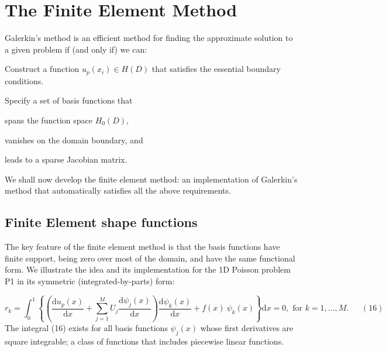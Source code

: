 \hypertarget{index_fe}{}\section{The Finite Element Method}\label{index_fe}
Galerkin's method is an efficient method for finding the approximate solution to a given problem if (and only if) we can\-:
\begin{DoxyEnumerate}
\item Construct a function $ u_p(x_i) \in H(D)$ that satisfies the essential boundary conditions.
\item Specify a set of basis functions that
\begin{DoxyEnumerate}
\item spans the function space $ H_0(D)$,
\item vanishes on the domain boundary, and
\item leads to a sparse Jacobian matrix.
\end{DoxyEnumerate}
\end{DoxyEnumerate}We shall now develop the finite element method\-: an implementation of Galerkin's method that automatically satisfies all the above requirements.



\hypertarget{index_fe_basis_fct}{}\subsection{Finite Element shape functions}\label{index_fe_basis_fct}
The key feature of the finite element method is that the basis functions have finite support, being zero over most of the domain, and have the same functional form. We illustrate the idea and its implementation for the 1\-D Poisson problem P1 in its symmetric (integrated-\/by-\/parts) form\-:

\[ r_k = \int_0^1 \left\{ \left( \frac{\mbox{d} u_p(x)}{\mbox{d} x} +\sum_{j=1}^{M} U_{j} \frac{\mbox{d} \psi_j(x)}{\mbox{d} x} \right) \frac{\mbox{d} \psi_k(x)}{\mbox{d} x} + f(x) \ \psi_k(x) \right\} \mbox{d}x =0, \mbox{\ \ \ \ \ \ for $k=1,...,M.$}\ \ \ \ \ \ \ (16) \] The integral (16) exists for all basis functions $ \psi_j(x)$ whose first derivatives are square integrable; a class of functions that includes piecewise linear functions.

